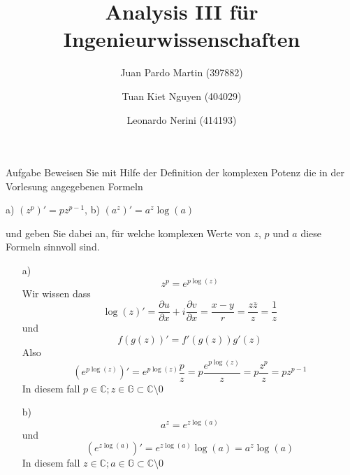 \documentclass{scrartcl}
\title{Analysis III für Ingenieurwissenschaften}
\author{Juan Pardo Martin (397882)\and Tuan Kiet Nguyen (404029)\and Leonardo Nerini (414193)}
\def\mbb#1{\mathbb{#1}}
\def\bC{\mbb{C}}
\begin{document}
\maketitle

\begin{section}{Aufgabe}%
Beweisen Sie mit Hilfe der Definition der komplexen Potenz die in der Vorlesung angegebenen Formeln
\begin{center}
a) \((z^p)'=p z^{p-1}\),    b) \((a^z)'=a^z \log(a)\)
\end{center}

und geben Sie dabei an, für welche komplexen Werte von $z$, $p$ und $a$ diese Formeln
sinnvoll sind.
\begin{itemize}
\item[a)]
\[z^p=e^{p \log(z)}\]
Wir wissen dass
\[\log(z)'=\frac{\partial u}{\partial x}+i \frac{\partial v}{\partial x}=\frac{x-y}{r}=\frac{z \overline{z}}{z}=\frac{1}{z}\]
und \[f(g(z))'=f'(g(z))g'(z)\]
Also \[(e^{p \log(z)})'=e^{p \log(z)}\frac{p}{z}=p\frac{e^{p \log(z)}}{z}=p\frac{z^p}{z}=p z^{p-1}\]
In diesem fall \(p\in \bC;z\in \mathbb G\subset \mathbb C\setminus\qty{0}\)
\item[b)]
\newpage
\[a^z=e^{z \log(a)}\]
und
\[(e^{z \log(a)})'=e^{z \log(a)}\log(a)=a^z \log(a)\]
In diesem fall \(z\in \bC;a\in \mathbb G\subset \mathbb C\setminus\qty{0}\)
\end{itemize}
\end{section}
\end{document}

